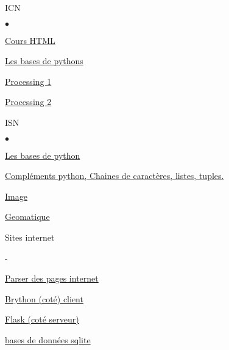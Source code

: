 \documentclass[10pt,dvipsnames,  dvips]{article}
\newcounter{Chapter}
\newcounter{Sec}[Chapter]
\begin{document}

\begin{list}{}{}
\item ICN
	\begin{list}{$\bullet$}{}
	\item \href{https://github.com/debimax/cours-debimax/raw/master/icn/cours-html.pdf}{Cours HTML}
	\item \href{https://mybinder.org/v2/gh/debimax/cours-debimax/master?filepath=seconde%2Fpython_seconde.ipynb}{Les bases de pythons}
	\item \href{https://mybinder.org/v2/gh/debimax/cours-debimax/master?filepath=icn%2FProcessing_Python_1.ipynb}{Processing 1}
	\item \href{http://htmlpreview.github.com/?https://github.com/debimax/cours-debimax/blob/master/icn/Processing_Python_2.html}{Processing 2}
	\end{list}
\item ISN
	\begin{list}{$\bullet$}{}
	\item \href{https://mybinder.org/v2/gh/debimax/cours-debimax/master?filepath=isn%2Fbases.ipynb}{Les bases de python}
	\item \href{https://mybinder.org/v2/gh/debimax/cours-debimax/master?filepath=isn%2Fstring-listes.ipynb}{Compléments python, Chaines de caractères, listes, tuples.}
	\item \href{https://mybinder.org/v2/gh/debimax/cours-debimax/master?filepath=isn%2Fimages.ipynb}{Image}
	\item \href{https://mybinder.org/v2/gh/debimax/cours-debimax/master?filepath=isn%2FCartographie.ipynb}{Geomatique}
	\item Sites internet
		\begin{list}{-}{}
		\item \href{https://mybinder.org/v2/gh/debimax/cours-debimax/master?filepath=isn%2FParser_des_pages_internet.ipynb}{Parser des pages internet}
		\item \href{https://mybinder.org/v2/gh/debimax/cours-debimax/master?filepath=isn%2FBrython.ipynb}{Brython (coté) client}
		\item \href{https://mybinder.org/v2/gh/debimax/cours-debimax/master?filepath=isn%2Fflask.ipynb}{Flask (coté serveur)}
		\end{list}
	\item \href{https://mybinder.org/v2/gh/debimax/cours-debimax/master?filepath=isn%2FBases%20de%20donnees.ipynb}{bases de données sqlite}
	\end{list}
\end{list}
\end{document}
